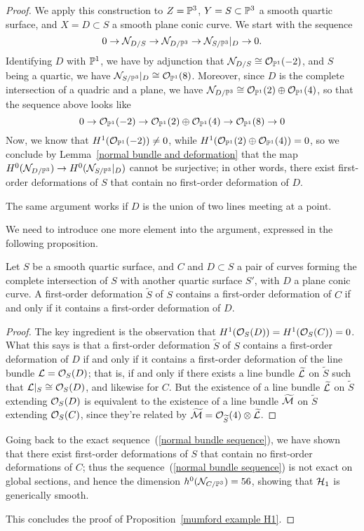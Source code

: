 \begin{proof}
We apply this construction to $Z = \PP^3$, $Y = S \subset \PP^3$ a smooth quartic surface, and $X = D \subset S$ a smooth plane conic curve. We start with the sequence
$$
0 \to \cN_{D/S} \to \cN_{D/\PP^3} \to \cN_{S/\PP^3}|_D \to 0.
$$
Identifying $D$ with $\PP^1$, we have by adjunction that $\cN_{D/S} \cong \cO_{\PP^1}(-2)$, and $S$ being a quartic, we have $\cN_{S/\PP^3}|_D \cong \cO_{\PP^1}(8)$. Moreover, since $D$ is the complete intersection of a quadric and a plane, we have $\cN_{D/\PP^3} \cong \cO_{\PP^1}(2) \oplus  \cO_{\PP^1}(4)$, so that the sequence above looks like
$$
0 \to \cO_{\PP^1}(-2) \to \cO_{\PP^1}(2) \oplus \cO_{\PP^1}(4) \to \cO_{\PP^1}(8) \to 0
$$
Now, we know that $H^1(\cO_{\PP^1}(-2)) \neq 0$, while $H^1(\cO_{\PP^1}(2) \oplus \cO_{\PP^1}(4)) = 0$, so we conclude by Lemma~\ref{normal bundle and deformation} that the map
$H^0(\cN_{D/\PP^3}) \to H^0(\cN_{S/\PP^3}|_D)$ cannot be surjective; in other words, there exist first-order deformations of $S$ that contain no first-order deformation of $D$.

The same argument works if $D$ is the union of two lines meeting at a point.

We need to introduce one more element into the argument, expressed in the following proposition.

\begin{proposition}\label{special NL}
Let $S$ be a smooth quartic surface, and $C$ and $D \subset S$ a pair of curves forming the complete intersection of $S$ with another quartic surface $S'$, with $D$ a plane conic curve. A first-order deformation $\widetilde S$ of $S$ contains a first-order deformation of $C$ if and only if it contains a first-order deformation of $D$.
\end{proposition}

\begin{proof}
The key ingredient is the observation that $H^1(\cO_S(D)) = H^1(\cO_S(C)) = 0$. What this says is that a first-order deformation $\widetilde S$ of $S$ contains a first-order deformation of $D$ if and only if it contains a first-order deformation of the line bundle $\cL = \cO_S(D)$; that is, if and only if there exists a line bundle $\widetilde \cL$ on $\widetilde S$ such that $\cL|_S \cong \cO_S(D)$, and likewise for $C$. But the existence of a line bundle $\widetilde \cL$ on $\widetilde S$ extending $\cO_S(D)$ is equivalent to the existence of a line bundle $\widetilde \cM$ on $\widetilde S$ extending $\cO_S(C)$, since they're related by $\widetilde \cM = \cO_{\widetilde S}(4) \otimes \widetilde \cL$.
\end{proof}

Going back to the exact sequence~(\ref{normal bundle sequence}), we have shown that there exist first-order deformations of $S$ that contain no first-order deformations of $C$; thus the sequence~(\ref{normal bundle sequence}) is not exact on global sections, and hence the dimension $h^0(\cN_{C/\PP^3}) = 56$, showing that $\cH_1$ is generically smooth.

This concludes the proof of Proposition~\ref{mumford example H1}.
\end{proof}

